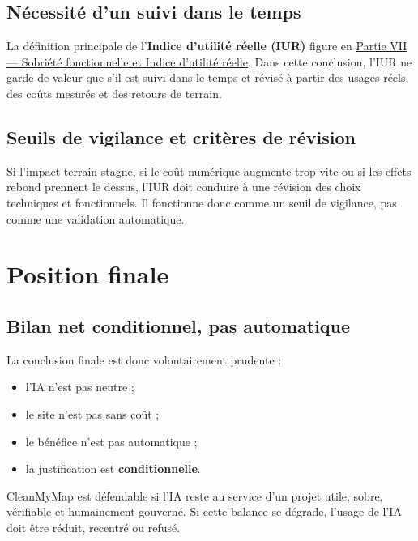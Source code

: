 \documentclass[
  10pt,
  a4paper,
  DIV=11,
  numbers=noendperiod,
  oneside]{scrreprt}
\providecommand{\tightlist}{%
  \setlength{\itemsep}{0pt}\setlength{\parskip}{0pt}}
\let\oldtextbf\textbf
\renewcommand{\textbf}[1]{\oldtextbf{\textcolor{cmmnavy}{#1}}}
\begin{document}
\subsection{Nécessité d'un suivi dans le
temps}\label{nuxe9cessituxe9-dun-suivi-dans-le-temps}

La définition principale de l'\textbf{Indice d'utilité réelle (IUR)}
figure en
\hyperref[partie-vii-sobriete-fonctionnelle-et-indice-dutilite-reelle]{Partie
VII --- Sobriété fonctionnelle et Indice d'utilité réelle}. Dans cette
conclusion, l'IUR ne garde de valeur que s'il est suivi dans le temps et
révisé à partir des usages réels, des coûts mesurés et des retours de
terrain.

\subsection{Seuils de vigilance et critères de
révision}\label{seuils-de-vigilance-et-crituxe8res-de-ruxe9vision}

Si l'impact terrain stagne, si le coût numérique augmente trop vite ou
si les effets rebond prennent le dessus, l'IUR doit conduire à une
révision des choix techniques et fonctionnels. Il fonctionne donc comme
un seuil de vigilance, pas comme une validation automatique.

\section{Position finale}\label{position-finale}

\subsection{Bilan net conditionnel, pas
automatique}\label{bilan-net-conditionnel-pas-automatique}

La conclusion finale est donc volontairement prudente :

\begin{itemize}
\tightlist
\item
  l'IA n'est pas neutre ;
\item
  le site n'est pas sans coût ;
\item
  le bénéfice n'est pas automatique ;
\item
  la justification est \textbf{conditionnelle}.
\end{itemize}

CleanMyMap est défendable si l'IA reste au service d'un projet utile,
sobre, vérifiable et humainement gouverné. Si cette balance se dégrade,
l'usage de l'IA doit être réduit, recentré ou refusé.
\end{document}
